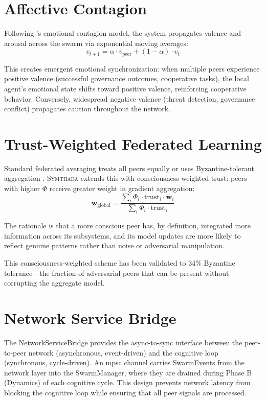 \documentclass[12pt]{book}
\newcommand{\symthaea}{\textsc{Symthaea}}
\begin{document}
\section{Affective Contagion}

Following \citet{hatfield1993}'s emotional contagion model, the system propagates valence and arousal across the swarm via exponential moving averages:
\begin{equation}
v_{t+1} = \alpha \cdot v_{\text{peer}} + (1 - \alpha) \cdot v_t
\end{equation}

This creates emergent emotional synchronization: when multiple peers experience positive valence (successful governance outcomes, cooperative tasks), the local agent's emotional state shifts toward positive valence, reinforcing cooperative behavior. Conversely, widespread negative valence (threat detection, governance conflict) propagates caution throughout the network.

\section{Trust-Weighted Federated Learning}

Standard federated averaging \citep{mcmahan2017} treats all peers equally or uses Byzantine-tolerant aggregation \citep{blanchard2017}. \symthaea{} extends this with consciousness-weighted trust: peers with higher $\Phi$ receive greater weight in gradient aggregation:
\begin{equation}
\mathbf{w}_{\text{global}} = \frac{\sum_i \Phi_i \cdot \text{trust}_i \cdot \mathbf{w}_i}{\sum_i \Phi_i \cdot \text{trust}_i}
\end{equation}

The rationale is that a more conscious peer has, by definition, integrated more information across its subsystems, and its model updates are more likely to reflect genuine patterns rather than noise or adversarial manipulation.

This consciousness-weighted scheme has been validated to 34\% Byzantine tolerance---the fraction of adversarial peers that can be present without corrupting the aggregate model.

\section{Network Service Bridge}

The NetworkServiceBridge provides the async-to-sync interface between the peer-to-peer network (asynchronous, event-driven) and the cognitive loop (synchronous, cycle-driven). An mpsc channel carries SwarmEvents from the network layer into the SwarmManager, where they are drained during Phase B (Dynamics) of each cognitive cycle. This design prevents network latency from blocking the cognitive loop while ensuring that all peer signals are processed.
\end{document}
